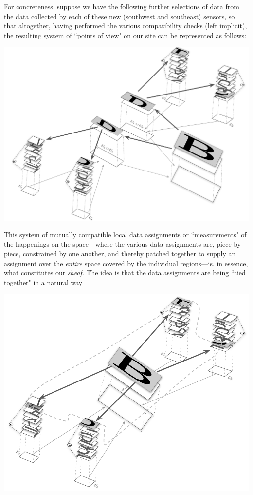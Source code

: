 \documentclass[a4paper]{book}
\theoremstyle{definition}
\theoremstyle{definition}
\theoremstyle{definition}
\theoremstyle{theorem}
\theoremstyle{definition}
\begin{document}
	For concreteness, suppose we have the following further selections of data from the data collected by each of these new (southwest and southeast) sensors, so that altogether, having performed the various compatibility checks (left implicit), the resulting system of ``points of view" on our site can be represented as follows:
	\begin{center}
		\includegraphics[angle=16, scale=0.3]{BestSheafEye1.png}
	\end{center} 
	This system of mutually compatible local data assignments or ``measurements" of the happenings on the space---where the various data assignments are, piece by piece, constrained by one another, and thereby patched together to supply an assignment over the \textit{entire} space covered by the individual regions---is, in essence, what constitutes our \textit{sheaf}. The idea is that the data assignments are being ``tied together" in a natural way  
	\begin{center}
		\includegraphics[angle=16, scale=0.3]{Lassoo.png}
	\end{center} 
\end{document}
